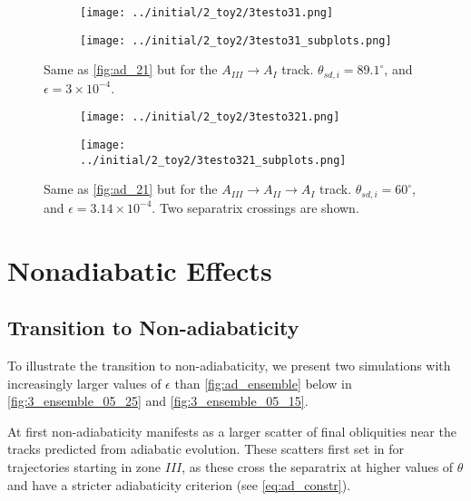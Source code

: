 \documentclass[
        fleqn,
        usenatbib,
        referee,
    ]{mnras}
\begin{document}
\begin{figure}
    \centering
    \begin{subfigure}{\columnwidth}
        \centering
        \texttt{[image: ../initial/2\_toy2/3testo31.png]}
    \end{subfigure}
    \begin{subfigure}{\columnwidth}
        \centering
        \texttt{[image: ../initial/2\_toy2/3testo31\_subplots.png]}
    \end{subfigure}
    \caption{Same as \autoref{fig:ad_21} but for the $A_{III} \to A_I$
    track. $\theta_{sd, i} = 89.1^\circ$, and $\epsilon = 3 \times
    10^{-4}$.}\label{fig:ad_31}
\end{figure}
\begin{figure}
    \centering
    \begin{subfigure}{\columnwidth}
        \centering
        \texttt{[image: ../initial/2\_toy2/3testo321.png]}
    \end{subfigure}
    \begin{subfigure}{\columnwidth}
        \centering
        \texttt{[image: ../initial/2\_toy2/3testo321\_subplots.png]}
    \end{subfigure}
    \caption{Same as \autoref{fig:ad_21} but for the $A_{III} \to A_{II} \to A_I$
    track. $\theta_{sd, i} = 60^\circ$, and $\epsilon = 3.14 \times 10^{-4}$.
    Two separatrix crossings are shown.}\label{fig:ad_321}
\end{figure}

\section{Nonadiabatic Effects}\label{s:nonad}

\subsection{Transition to Non-adiabaticity}

To illustrate the transition to non-adiabaticity, we present two simulations
with increasingly larger values of $\epsilon$ than \autoref{fig:ad_ensemble}
below in \autoref{fig:3_ensemble_05_25} and \autoref{fig:3_ensemble_05_15}.

At first non-adiabaticity manifests as a larger scatter of final obliquities
near the tracks predicted from adiabatic evolution. These scatters first set in
for trajectories starting in zone $III$, as these cross the separatrix at higher
values of $\theta$ and have a stricter adiabaticity criterion (see
\autoref{eq:ad_constr}).
\end{document}
